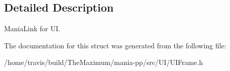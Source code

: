 \subsection{Detailed Description}
Mania\-Link for U\-I. 

The documentation for this struct was generated from the following file\-:\begin{DoxyCompactItemize}
\item 
/home/travis/build/\-The\-Maximum/mania-\/pp/src/\-U\-I/U\-I\-Frame.\-h\end{DoxyCompactItemize}
